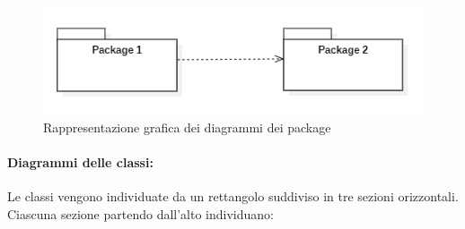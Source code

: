 \begin{figure}
		\centering\includegraphics{../immagini/normeUML/pk_uml.png}
		\caption{Rappresentazione grafica dei diagrammi dei package}
\end{figure}
\paragraph{Diagrammi delle classi:}\label{ProcessiPrimariProgettazioneUMLDiagrammiDelle Classi} 
Le classi vengono individuate da un rettangolo suddiviso in tre sezioni orizzontali. Ciascuna sezione partendo dall'alto individuano:
